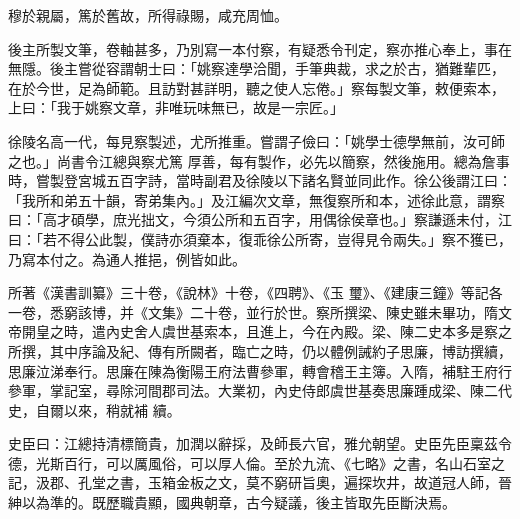 \begin{pinyinscope}
 穆於親屬，篤於舊故，所得祿賜，咸充周恤。



 後主所製文筆，卷軸甚多，乃別寫一本付察，有疑悉令刊定，察亦推心奉上，事在無隱。後主嘗從容謂朝士曰：「姚察達學洽聞，手筆典裁，求之於古，猶難輩匹，在於今世，足為師範。且訪對甚詳明，聽之使人忘倦。」察每製文筆，敕便索本，上曰：「我于姚察文章，非唯玩味無已，故是一宗匠。」



 徐陵名高一代，每見察製述，尤所推重。嘗謂子儉曰：「姚學士德學無前，汝可師之也。」尚書令江總與察尤篤
 厚善，每有製作，必先以簡察，然後施用。總為詹事時，嘗製登宮城五百字詩，當時副君及徐陵以下諸名賢並同此作。徐公後謂江曰：「我所和弟五十韻，寄弟集內。」及江編次文章，無復察所和本，述徐此意，謂察曰：「高才碩學，庶光拙文，今須公所和五百字，用偶徐侯章也。」察謙遜未付，江曰：「若不得公此製，僕詩亦須棄本，復乖徐公所寄，豈得見令兩失。」察不獲已，乃寫本付之。為通人推挹，例皆如此。



 所著《漢書訓纂》三十卷，《說林》十卷，《四聘》、《玉
 璽》、《建康三鐘》等記各一卷，悉窮該博，并《文集》二十卷，並行於世。察所撰梁、陳史雖未畢功，隋文帝開皇之時，遣內史舍人虞世基索本，且進上，今在內殿。梁、陳二史本多是察之所撰，其中序論及紀、傳有所闕者，臨亡之時，仍以體例誡約子思廉，博訪撰續，思廉泣涕奉行。思廉在陳為衡陽王府法曹參軍，轉會稽王主簿。入隋，補駐王府行參軍，掌記室，尋除河間郡司法。大業初，內史侍郎虞世基奏思廉踵成梁、陳二代史，自爾以來，稍就補
 續。



 史臣曰：江總持清標簡貴，加潤以辭採，及師長六官，雅允朝望。史臣先臣稟茲令德，光斯百行，可以厲風俗，可以厚人倫。至於九流、《七略》之書，名山石室之記，汲郡、孔堂之書，玉箱金板之文，莫不窮研旨奧，遍探坎井，故道冠人師，晉紳以為準的。既歷職貴顯，國典朝章，古今疑議，後主皆取先臣斷決焉。



\end{pinyinscope}